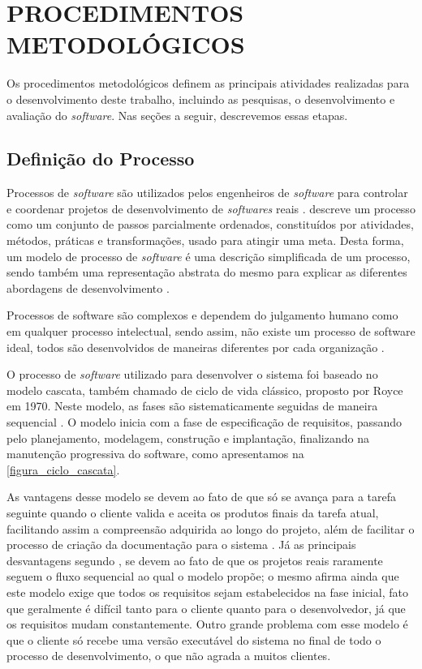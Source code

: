 \section{PROCEDIMENTOS METODOLÓGICOS}

Os procedimentos metodológicos definem as principais atividades realizadas para o desenvolvimento deste trabalho, incluindo as pesquisas, o desenvolvimento e avaliação do \textit{software}. Nas seções a seguir, descrevemos essas etapas.

\subsection{Definição do Processo}
Processos de \textit{software} são utilizados pelos engenheiros de \textit{software} para controlar e coordenar projetos de desenvolvimento de \textit{softwares} reais \cite{talma2006desenvolvimento}.  descreve um processo como um conjunto de passos parcialmente  ordenados, constituídos por atividades, métodos, práticas e transformações, usado para atingir uma meta. Desta forma, um modelo de processo de \textit{software} é uma descrição simplificada de um processo, sendo também uma representação abstrata do mesmo para explicar as diferentes abordagens de desenvolvimento \cite{sommerville2003engenharia}.

Processos de software são complexos e dependem do julgamento humano como em qualquer processo intelectual, sendo assim, não existe um processo de software ideal, todos são desenvolvidos de maneiras diferentes por cada organização \cite{sommerville2003engenharia}.

O processo de \textit{software} utilizado para desenvolver o sistema foi baseado no modelo cascata, também chamado de ciclo de vida clássico, proposto por Royce em 1970. Neste modelo, as fases são sistematicamente seguidas de maneira sequencial \cite{pressman2006engenharia}. O modelo inicia com a fase de especificação de requisitos, passando pelo planejamento, modelagem, construção e implantação, finalizando na manutenção progressiva do software, como apresentamos na \autoref{figura_ciclo_cascata}.

As vantagens desse modelo se devem ao fato de que só se avança para a tarefa seguinte quando o cliente valida e aceita os produtos finais da tarefa atual, facilitando assim a compreensão adquirida ao longo do projeto, além de facilitar o processo de criação da documentação para o sistema \cite{pressman2006engenharia}. Já as principais desvantagens segundo , se devem ao fato de que os projetos reais raramente seguem o fluxo sequencial ao qual o modelo propõe; o mesmo afirma ainda que este modelo exige que todos os requisitos sejam estabelecidos na fase inicial, fato que geralmente é difícil tanto para o cliente quanto para o desenvolvedor, já que os requisitos mudam constantemente. Outro grande problema com esse modelo é que o cliente só recebe uma versão executável do sistema no final de todo o processo de desenvolvimento, o que não agrada a muitos clientes.

